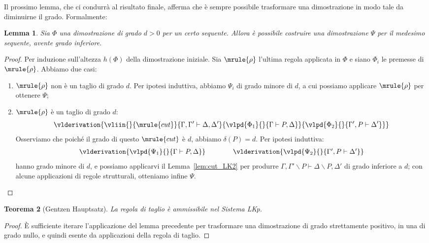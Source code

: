 \documentclass[12pt,a4paper,openright,twoside]{report}
\newtheorem{thm}{Teorema}[section]
\newtheorem{lem}[thm]{Lemma}
\begin{document}
Il prossimo lemma, che ci condurr\`a al risultato finale, afferma che \`e sempre possibile trasformare una dimostrazione in modo tale da diminuirne il grado. Formalmente:

\begin{lem}\label{lem:cut_LK3}
Sia $\Phi$ una dimostrazione di grado $d > 0$ per un certo sequente. Allora \`e possibile costruire una dimostrazione $\Psi$ per il medesimo sequente, avente grado inferiore.
\end{lem}
\begin{proof}
Per induzione sull'altezza $h(\Phi)$ della dimostrazione iniziale. Sia $\mrule{\rho}$ l'ultima regola applicata in $\Phi$ e siano $\Phi_i$ le premesse di $\mrule{\rho}$. Abbiamo due casi:
\begin{enumerate}
	\item $\mrule{\rho}$ non \`e un taglio di grado $d$. Per ipotesi induttiva, abbiamo $\Psi_i$ di grado minore di $d$, a cui possiamo applicare $\mrule{\rho}$ per ottenere $\Psi$;
	\item $\mrule{\rho}$ \`e un taglio di grado $d$:
	$$
		\vlderivation{
			\vliin{}{\mrule{cut}}
				{\Gamma, \Gamma' \vdash \Delta, \Delta'}
				{\vlpd{\Phi_1}{}{\Gamma \vdash P, \Delta}}
				{\vlpd{\Phi_2}{}{\Gamma', P \vdash \Delta'}}
		}
	$$
	Osserviamo che poich\'e il grado di questo $\mrule{cut}$ \`e $d$, abbiamo $\delta(P) = d$. Per ipotesi induttiva:
	$$
	\begin{array}{ccc}
		\vlderivation{\vlpd{\Psi_1}{}{\Gamma \vdash P, \Delta}} 
		& \qquad & 
		\vlderivation{\vlpd{\Psi_2}{}{\Gamma', P \vdash \Delta'}} 
	\end{array}
	$$
	hanno grado minore di $d$, e possiamo applicarvi il Lemma~\ref{lem:cut_LK2} per produrre $\Gamma, \Gamma'{\smallsetminus}P \vdash \Delta{\smallsetminus}P, \Delta'$ di grado inferiore a $d$; con alcune applicazioni di regole strutturali, otteniamo infine $\Psi$.
\end{enumerate}
\end{proof}

\begin{thm}[Gentzen Hauptsatz]\label{thm:haupt_lk}
La regola di taglio \`e ammissibile nel Sistema \textsf{LKp}.
\end{thm}
\begin{proof}
\`E sufficiente iterare l'applicazione del lemma precedente per trasformare una dimostrazione di grado strettamente positivo, in una di grado nullo, e quindi esente da applicazioni della regola di taglio.
\end{proof}
\end{document}
